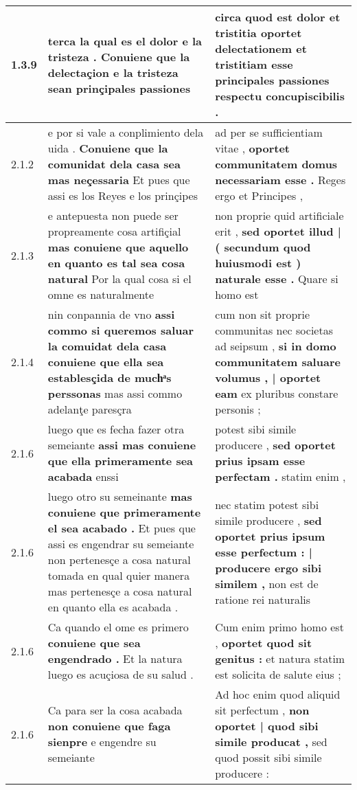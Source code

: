 \begin{tabular}{|p{1cm}|p{6.5cm}|p{6.5cm}|}
1.3.9 & terca la qual es el dolor e la tristeza . \textbf{ Conuiene que la delectaçion e la tristeza } sean prinçipales passiones & circa quod est dolor et tristitia \textbf{ oportet delectationem et tristitiam } esse principales passiones respectu concupiscibilis . \\\hline
2.1.2 & e por si vale a conplimiento dela uida . \textbf{ Conuiene que la comunidat dela casa sea mas neçessaria } Et pues que assi es los Reyes e los prinçipes & ad per se sufficientiam vitae , \textbf{ oportet communitatem domus necessariam esse . } Reges ergo et Principes , \\\hline
2.1.3 & e antepuesta non puede ser propreamente cosa artifiçial \textbf{ mas conuiene que aquello en quanto es tal sea cosa natural } Por la qual cosa si el omne es naturalmente & non proprie quid artificiale erit , \textbf{ sed oportet illud | ( secundum quod huiusmodi est ) naturale esse . } Quare si homo est \\\hline
2.1.4 & nin conpannia de vno \textbf{ assi commo si queremos saluar la comuidat dela casa conuiene que ella sea establesçida de muchͣs perssonas } mas assi commo adelanţe paresçra & cum non sit proprie communitas nec societas ad seipsum , \textbf{ si in domo communitatem saluare volumus , | oportet eam } ex pluribus constare personis ; \\\hline
2.1.6 & luego que es fecha fazer otra semeiante \textbf{ assi mas conuiene que ella primeramente sea acabada } enssi & potest sibi simile producere , \textbf{ sed oportet prius ipsam esse perfectam . } statim enim , \\\hline
2.1.6 & luego otro su semeinante \textbf{ mas conuiene que primeramente el sea acabado . } Et pues que assi es engendrar su semeiante non pertenesçe a cosa natural tomada en qual quier manera mas pertenesçe a cosa natural en quanto ella es acabada . & nec statim potest sibi simile producere , \textbf{ sed oportet prius ipsum esse perfectum : | producere ergo sibi similem , } non est de ratione rei naturalis \\\hline
2.1.6 & Ca quando el ome es primero \textbf{ conuiene que sea engendrado . } Et la natura luego es acuçiosa de su salud . & Cum enim primo homo est , \textbf{ oportet quod sit genitus : } et natura statim est solicita de salute eius ; \\\hline
2.1.6 & Ca para ser la cosa acabada \textbf{ non conuiene que faga sienpre } e engendre su semeiante & Ad hoc enim quod aliquid sit perfectum , \textbf{ non oportet | quod sibi simile producat , } sed quod possit sibi simile producere : \\\hline

\end{tabular}
